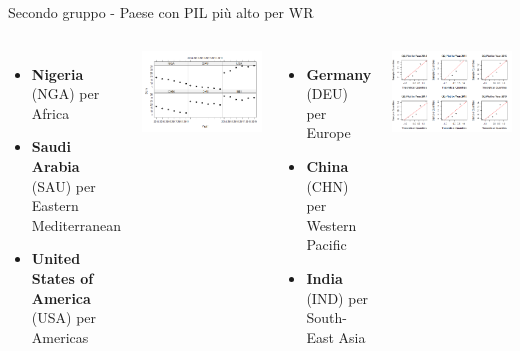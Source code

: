 \documentclass{beamer}
\begin{document}
\begin{frame}{Secondo gruppo - Paese con PIL più alto per WR}
	\begin{columns}
			\begin{itemize}
				\item \textbf{Nigeria} (NGA) per Africa
				\item \textbf{Saudi Arabia} (SAU) per Eastern Mediterranean
				\item \textbf{United States of America} (USA) per Americas
			\end{itemize}
			\bigskip
			\includegraphics[width=\linewidth]{Images/7 - Secondgroup.png}
			\begin{itemize}
				\item \textbf{Germany} (DEU) per Europe
				\item \textbf{China} (CHN) per Western Pacific
				\item \textbf{India} (IND) per South-East Asia
			\end{itemize}
			\bigskip
			\includegraphics[width=\linewidth]{Images/8 - Secondqq.png}
	\end{columns}
\end{frame}
\end{document}
